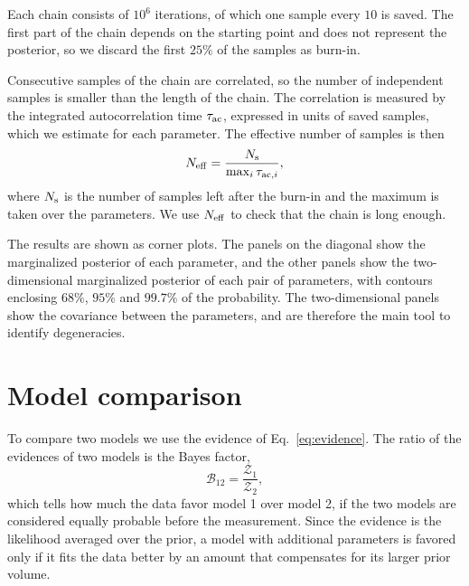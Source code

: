 Each chain consists of $10^6$ iterations, of which one sample every $10$ is
saved. The first part of the chain depends on the starting point and does not
represent the posterior, so we discard the first $25\%$ of the samples as
burn-in.

Consecutive samples of the chain are correlated, so the number of independent
samples is smaller than the length of the chain. The correlation is measured
by the integrated autocorrelation time $\tau_{\rm ac}$, expressed in units of
saved samples, which we estimate for each parameter. The effective number of
samples is then
\begin{equation}
    N_{\rm eff} = \frac{N_{\rm s}}{\max_i \tau_{{\rm ac},i}},
    \label{eq:neff}
\end{equation}
where $N_{\rm s}$ is the number of samples left after the burn-in and the
maximum is taken over the parameters. We use $N_{\rm eff}$ to check that the
chain is long enough.

The results are shown as corner plots. The panels on the diagonal show the
marginalized posterior of each parameter, and the other panels show the
two-dimensional marginalized posterior of each pair of parameters, with
contours enclosing $68\%$, $95\%$ and $99.7\%$ of the probability. The
two-dimensional panels show the covariance between the parameters, and are
therefore the main tool to identify degeneracies.

\section{Model comparison} \label{sec:model_selection}

To compare two models we use the evidence of Eq.~\eqref{eq:evidence}. The
ratio of the evidences of two models is the Bayes factor,
\begin{equation}
    \mathcal{B}_{12} = \frac{\mathcal{Z}_1}{\mathcal{Z}_2},
    \label{eq:bayes_factor}
\end{equation}
which tells how much the data favor model 1 over model 2, if the two models
are considered equally probable before the measurement. Since the evidence is
the likelihood averaged over the prior, a model with additional parameters is
favored only if it fits the data better by an amount that compensates for its
larger prior volume.

